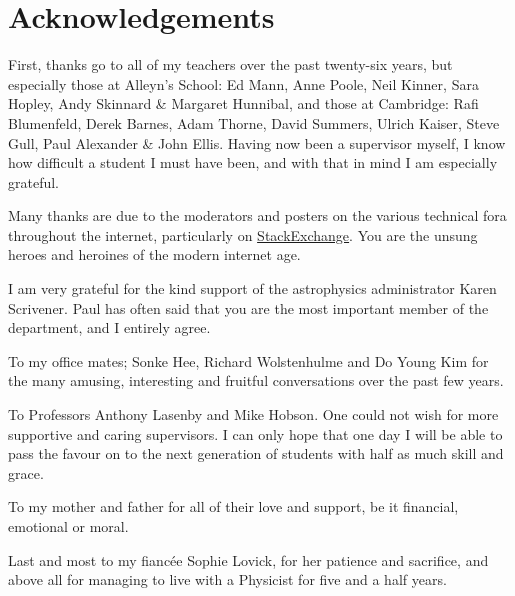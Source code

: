 \chapter{Acknowledgements}

First, thanks go to all of my teachers over the past twenty-six years, but especially those at Alleyn's School: Ed Mann, Anne Poole, Neil Kinner, Sara Hopley, Andy Skinnard \& Margaret Hunnibal, and those at Cambridge: Rafi Blumenfeld, Derek Barnes, Adam Thorne, David Summers, Ulrich Kaiser, Steve Gull, Paul Alexander \& John Ellis. Having now been a supervisor myself, I know how difficult a student I must have been, and with that in mind I am especially grateful.

Many thanks are due to the moderators and posters on the various technical fora throughout the internet, particularly on \mbox{\href{http://stackexchange.com/}{StackExchange}}. You are the unsung heroes and heroines of the modern internet age.

I am very grateful for the kind support of the astrophysics administrator Karen Scrivener. Paul has often said that you are the most important member of the department, and I entirely agree.

To my office mates; Sonke Hee, Richard Wolstenhulme and Do Young Kim for the many amusing, interesting and fruitful conversations over the past few years. 

To Professors Anthony Lasenby and Mike Hobson. One could not wish for more supportive and caring supervisors. I can only hope that one day I will be able to pass the favour on to the next generation of students with half as much skill and grace.

To my mother and father for all of their love and support, be it financial, emotional or moral.

Last and most to my fianc\'{e}e Sophie Lovick, for her patience and sacrifice, and above all for managing to live with a Physicist for five and a half years.
